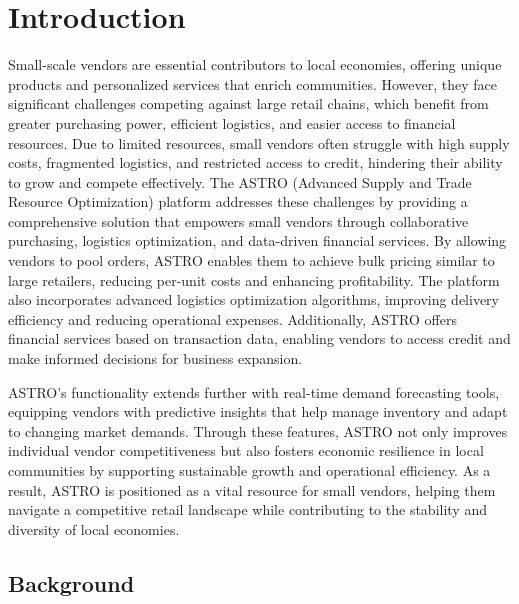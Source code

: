 \chapter{Introduction}

Small-scale vendors are essential contributors to local economies, offering unique products and
personalized services that enrich communities. However, they face significant challenges
competing against large retail chains, which benefit from greater purchasing power, efficient
logistics, and easier access to financial resources. Due to limited resources, small vendors often
struggle with high supply costs, fragmented logistics, and restricted access to credit, hindering
their ability to grow and compete effectively.
The ASTRO (Advanced Supply and Trade Resource Optimization) platform addresses these
challenges by providing a comprehensive solution that empowers small vendors through
collaborative purchasing, logistics optimization, and data-driven financial services. By allowing
vendors to pool orders, ASTRO enables them to achieve bulk pricing similar to large retailers,
reducing per-unit costs and enhancing profitability. The platform also incorporates advanced
logistics optimization algorithms, improving delivery efficiency and reducing operational
expenses. Additionally, ASTRO offers financial services based on transaction data, enabling
vendors to access credit and make informed decisions for business expansion.

ASTRO’s functionality extends further with real-time demand forecasting tools, equipping
vendors with predictive insights that help manage inventory and adapt to changing market
demands. Through these features, ASTRO not only improves individual vendor competitiveness
but also fosters economic resilience in local communities by supporting sustainable growth and
operational efficiency. As a result, ASTRO is positioned as a vital resource for small vendors,
helping them navigate a competitive retail landscape while contributing to the stability and
diversity of local economies.
\section{Background}

